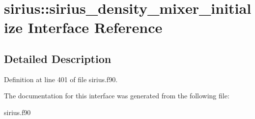 \hypertarget{interfacesirius_1_1sirius__density__mixer__initialize}{}\section{sirius\+:\+:sirius\+\_\+density\+\_\+mixer\+\_\+initialize Interface Reference}
\label{interfacesirius_1_1sirius__density__mixer__initialize}


\subsection{Detailed Description}


Definition at line 401 of file sirius.\+f90.



The documentation for this interface was generated from the following file\+:\begin{DoxyCompactItemize}
\item 
sirius.\+f90\end{DoxyCompactItemize}
